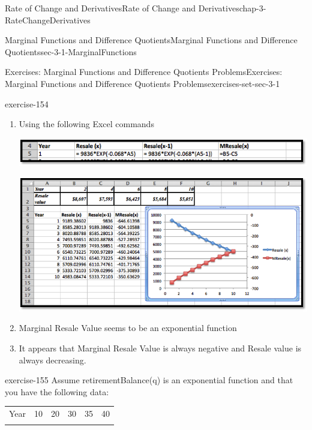 \documentclass[oneside,10pt,]{book}
\numberwithin{equation}{section}
\newcommand{\hrulethin}  {\noalign{\hrule height 0.04em}}
\newcommand{\hrulethick} {\noalign{\hrule height 0.11em}}
\begin{document}
\begin{chapterptx}{Rate of Change and Derivatives}{}{Rate of Change and Derivatives}{}{}{chap-3-RateChangeDerivatives}
\begin{sectionptx}{Marginal Functions and Difference Quotients}{}{Marginal Functions and Difference Quotients}{}{}{sec-3-1-MarginalFunctions}
\begin{exercises-subsection-numberless}{Exercises: Marginal Functions and Difference Quotients Problems}{}{Exercises: Marginal Functions and Difference Quotients Problems}{}{}{exercises-set-sec-3-1}
\begin{exercisegroup}
\begin{divisionexerciseeg}{15}{}{}{exercise-154}
\begin{enumerate}[label=(\alph*)]
%
\begin{equation*}
Resale\ Value(x)=9836e^{-0.068x}
\end{equation*}
%
\item\hypertarget{li-312}{}\hypertarget{p-1003}{}%
Using the following Excel commands%
\begin{sidebyside}{1}{0.1}{0.1}{0}%
\begin{sbspanel}{0.8}%
\includegraphics[width=1\linewidth]{images/sec3-1-sol15b.png}
\end{sbspanel}%
\end{sidebyside}%
\begin{sidebyside}{1}{0.1}{0.1}{0}%
\begin{sbspanel}{0.8}%
\includegraphics[width=1\linewidth]{images/sec3-1-sol15c.png}
\end{sbspanel}%
\end{sidebyside}%
\item\hypertarget{li-313}{}\hypertarget{p-1004}{}%
Marginal Resale Value seems to be an exponential function%
\item\hypertarget{li-314}{}\hypertarget{p-1005}{}%
It appears that Marginal Resale Value is always negative and Resale value is always decreasing.%
\end{enumerate}
\end{divisionexerciseeg}%
\begin{divisionexerciseeg}{16}{}{}{exercise-155}%
\hypertarget{p-1006}{}%
Assume retirementBalance(q) is an exponential function and that you have the following data:%
\begin{sidebyside}{1}{0}{0}{0}%
\begin{sbspanel}{1}%
{\centering%
\begin{tabular}{cccccc}\hrulethick
Year&10&20&30&35&40\tabularnewline\hrulethin

\end{tabular}}
\end{sbspanel}
\end{sidebyside}
\end{divisionexerciseeg}
\end{exercisegroup}
\end{exercises-subsection-numberless}
\end{sectionptx}
\end{chapterptx}
\end{document}
